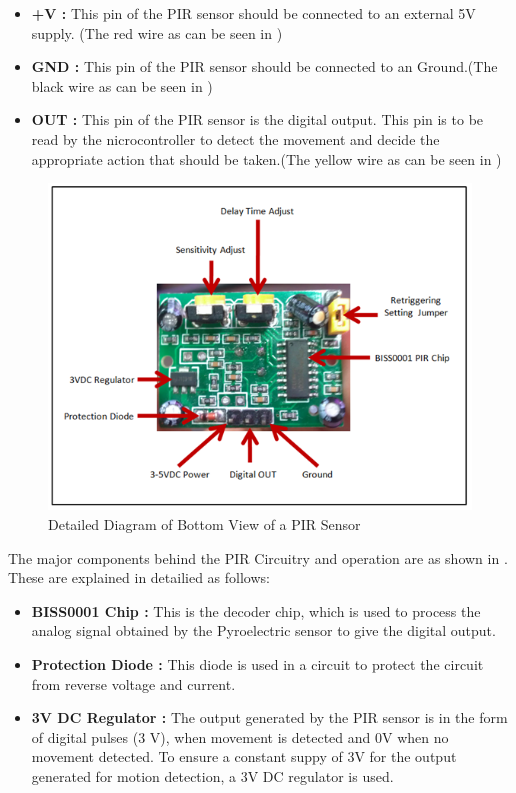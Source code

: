 \documentclass[a4paper,12 pt]{article}
\begin{document}
\begin{itemize}
\item \textbf{+V :} This pin of the PIR sensor should be connected to an external 5V supply. (The red wire as can be seen in )
\item \textbf{GND :} This pin of the PIR sensor should be connected to an Ground.(The black wire as can be seen in )
\item \textbf{OUT :} This pin of the PIR sensor is the digital output. This pin is to be read by the nicrocontroller to detect the movement and decide the appropriate action that should be taken.(The yellow wire as can be seen in )
\end{itemize}
\begin{figure}[h]
\begin{center}
\includegraphics[]{PIR_Sensor_3.png}
\caption{Detailed Diagram of Bottom View of a PIR Sensor}
\label{fig:4}
\end{center}
\end{figure}
The major components behind the PIR Circuitry and operation are as shown in . These are explained in detailied as follows:

\begin{itemize}
\item \textbf{BISS0001 Chip :} This is the decoder chip, which is used to process the analog signal obtained by the Pyroelectric sensor to give the digital output.
\item \textbf{Protection Diode :} This diode is used in a circuit to protect the circuit from reverse voltage and current.
\item \textbf{3V DC Regulator :} The output generated by the PIR sensor is in the form of digital pulses (3 V), when movement is detected and 0V when no movement detected. To ensure a constant suppy of 3V for the output generated for motion detection, a 3V DC regulator is used.
\end{itemize}
\end{document}
